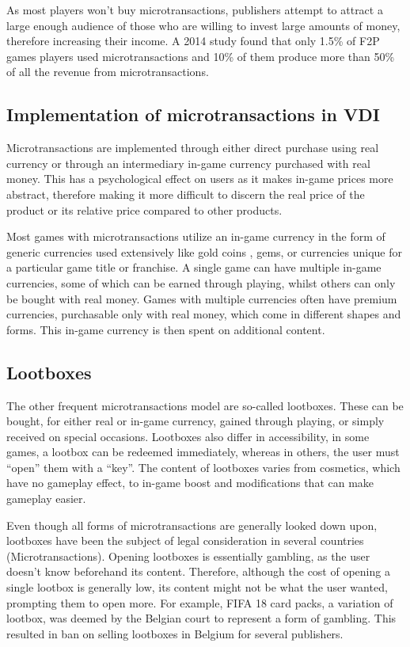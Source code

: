 \documentclass[10pt,british,a4paper,titlepage]{article}
\begin{document}
As most players won’t buy microtransactions, publishers attempt to attract a large enough audience of those who are willing to invest large amounts of money, therefore increasing their income. A 2014 study found that only 1.5\% of F2P games players used microtransactions and 10\% of them produce more than 50\% of all the revenue from microtransactions\cite{tomic2018economic:micro}.



\subsection{Implementation of microtransactions in VDI}

Microtransactions are implemented through either direct purchase using real currency or through an intermediary in-game currency purchased with real money. This has a psychological effect on users as it makes in-game prices more abstract, therefore making it more difficult to discern the real price of the product or its relative price compared to other products\cite{tomic2018economic:micro}.

Most games with microtransactions utilize an in-game currency in the form of generic currencies used extensively like gold coins , gems, or currencies unique for a particular game title or franchise. A single game can have multiple in-game currencies, some of which can be earned through playing, whilst others can only be bought with real money. Games with multiple currencies often have premium currencies, purchasable only with real money, which come in different shapes and forms. This in-game currency is then spent on additional content.



\subsection{Lootboxes}

The other frequent microtransactions model are so-called lootboxes. These can be bought, for either real or in-game currency, gained through playing, or simply received on special occasions. Lootboxes also differ in accessibility, in some games, a lootbox can be redeemed immediately, whereas in others, the user must “open” them with a “key”. The content of lootboxes varies from cosmetics, which have no gameplay effect, to in-game boost and modifications that can make gameplay easier. 

Even though all forms of microtransactions are generally looked down upon, lootboxes have been the subject of legal consideration in several countries (Microtransactions). Opening lootboxes is essentially gambling, as the user doesn’t know beforehand its content. Therefore, although the cost of opening a single lootbox is generally low, its content might not be what the user wanted, prompting them to open more. For example, FIFA 18 card packs, a variation of lootbox, was deemed by the Belgian court to represent a form of gambling. This resulted in ban on selling lootboxes in Belgium for several publishers\cite{tomic2018economic:micro}.
\end{document}
